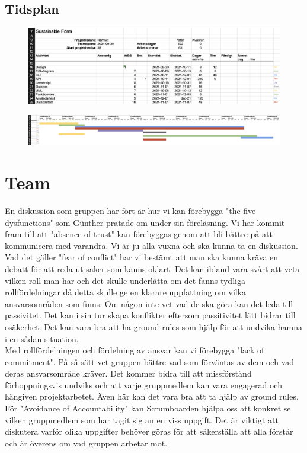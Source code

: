 \documentclass{article}
\begin{document}
\newpage
\subsection{Tidsplan}

\begin{figure}[htp]
    \centering
    \includegraphics[width = 450px]{grant1.png}
    \label{fig:24}
\end{figure}

\begin{figure}[htp]
    \centering
    \includegraphics[width = 450px]{Grant2.png}
    \label{fig:24}
\end{figure}

\section{Team}

En diskussion som gruppen har fört är hur vi kan förebygga "the five dysfunctions" som Günther pratade om under sin föreläsning. Vi har
kommit fram till att "absence of trust" kan förebyggas genom att bli bättre på att kommunicera med varandra. Vi är ju alla vuxna och ska kunna ta en diskussion. Vad det gäller "fear of conflict" har vi
bestämt att man ska kunna kräva en debatt för att reda ut saker som känns oklart. Det kan ibland
vara svårt att veta vilken roll man har och det skulle underlätta om det fanns tydliga
rollfördelningar då detta skulle ge en klarare uppfattning om vilka ansvarsområden som finns. Om någon inte vet vad de ska
göra kan det leda till passivitet. Det kan i sin tur skapa konflikter eftersom passitivitet lätt bidrar till osäkerhet. Det kan vara bra att ha ground rules som hjälp för att undvika hamna i en
sådan situation. \\
Med rollfördelningen och fördelning av ansvar kan vi förebygga "lack of
commitment". På så sätt vet gruppen bättre vad som förväntas av dem och vad deras ansvarsområde kräver. Det kommer bidra till att missförstånd förhoppningsvis undviks och att
varje gruppmedlem kan vara engagerad och hängiven projektarbetet. Även här kan det vara bra
att ta hjälp av ground rules. För "Avoidance of Accountability" kan Scrumboarden hjälpa oss att
konkret se vilken gruppmedlem som har tagit sig an en viss uppgift. Det är viktigt att diskutera
varför olika uppgifter behöver göras för att säkerställa att alla förstår och är överens om vad
gruppen arbetar mot.
\end{document}
